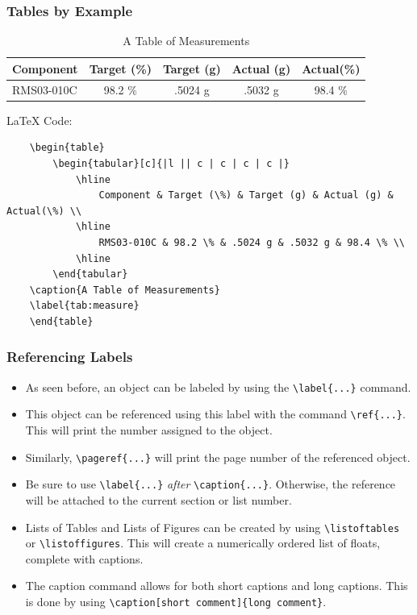 \documentclass{beamer}
\begin{document}
\begin{frame}[containsverbatim]
    \frametitle{Tables by Example}
    \begin{table}
        \begin{tabular}[c]{|l || c | c | c | c |}
            \hline
                Component & Target (\%) & Target (g) & Actual (g) & Actual(\%) \\
            \hline
                RMS03-010C & 98.2 \% & .5024 g & .5032 g & 98.4 \% \\
            \hline
        \end{tabular}
        \label{tab:measure}
        \caption{A Table of Measurements}
        \vspace{-15pt}
    \end{table}

    \begin{block}{\LaTeX{ }Code:}
    \footnotesize{
    \begin{verbatim}
    \begin{table}
        \begin{tabular}[c]{|l || c | c | c | c |}
            \hline
                Component & Target (\%) & Target (g) & Actual (g) & Actual(\%) \\
            \hline
                RMS03-010C & 98.2 \% & .5024 g & .5032 g & 98.4 \% \\
            \hline
        \end{tabular}
    \caption{A Table of Measurements}
    \label{tab:measure}
    \end{table}
    \end{verbatim}}
    \end{block} 
\end{frame}

\begin{frame}[containsverbatim]
    \frametitle{Referencing Labels}
    \begin{itemize}
    \item As seen before, an object can be labeled by using the \verb|\label{...}| command. 
    \item This object can be referenced using this label with the command \verb|\ref{...}|. This will print the number assigned to the object.
    \item Similarly, \verb|\pageref{...}| will print the page number of the referenced object.
    \item Be sure to use \verb|\label{...}| \emph{after} \verb|\caption{...}|. Otherwise, the reference will be attached to the current section or list number.
    \item Lists of Tables and Lists of Figures can be created by using \verb|\listoftables| or \verb|\listoffigures|. This will create a numerically ordered list of floats, complete with captions.
    \item The caption command allows for both short captions and long captions. This is done by using \verb|\caption[short comment]{long comment}|.
    \end{itemize}
\end{frame}
\end{document}
